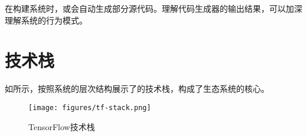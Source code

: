 \begin{content}

在构建系统时，或会自动生成部分源代码。理解代码生成器的输出结果，可以加深理解系统的行为模式。

\end{content}

\section{技术栈}

\begin{content}

如所示，按照系统的层次结构展示了\tf{}的技术栈，构成了\tf{}生态系统的核心。

\begin{figure}[H]
\centering
\texttt{[image: figures/tf-stack.png]}
\caption{TensorFlow技术栈}
 \label{fig:tf-stack}
\end{figure}

\end{content}

